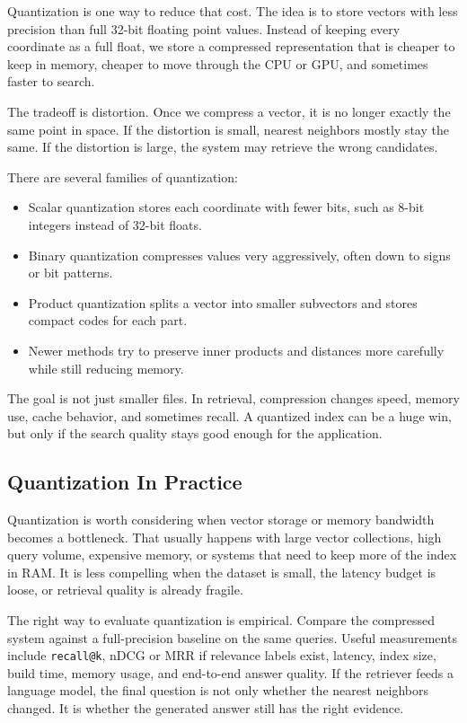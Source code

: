 \documentclass[12pt]{article}
\begin{document}
Quantization is one way to reduce that cost. The idea is to store vectors
with less precision than full 32-bit floating point values. Instead of
keeping every coordinate as a full float, we store a compressed
representation that is cheaper to keep in memory, cheaper to move through
the CPU or GPU, and sometimes faster to search.

The tradeoff is distortion. Once we compress a vector, it is no longer
exactly the same point in space. If the distortion is small, nearest
neighbors mostly stay the same. If the distortion is large, the system may
retrieve the wrong candidates.

There are several families of quantization:

\begin{itemize}
    \item Scalar quantization stores each coordinate with fewer bits, such
    as 8-bit integers instead of 32-bit floats.
    \item Binary quantization compresses values very aggressively, often
    down to signs or bit patterns.
    \item Product quantization splits a vector into smaller subvectors and
    stores compact codes for each part.
    \item Newer methods try to preserve inner products and distances more
    carefully while still reducing memory.
\end{itemize}

The goal is not just smaller files. In retrieval, compression changes
speed, memory use, cache behavior, and sometimes recall. A quantized index
can be a huge win, but only if the search quality stays good enough for
the application.

\subsection{Quantization In Practice}

Quantization is worth considering when vector storage or memory bandwidth
becomes a bottleneck. That usually happens with large vector collections,
high query volume, expensive memory, or systems that need to keep more of
the index in RAM. It is less compelling when the dataset is small, the
latency budget is loose, or retrieval quality is already fragile.

The right way to evaluate quantization is empirical. Compare the
compressed system against a full-precision baseline on the same queries.
Useful measurements include \texttt{recall@k}, nDCG or MRR if relevance
labels exist, latency, index size, build time, memory usage, and
end-to-end answer quality. If the retriever feeds a language model, the
final question is not only whether the nearest neighbors changed. It is
whether the generated answer still has the right evidence.
\end{document}
